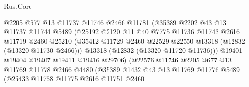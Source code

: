 \begin{lexlean}{RustCore}
\begin{coremodule}
                                @2205
                                @677
                                @13
                                @11737
                                @11746
                                @2466
                                @11781
                                (@35389
                                  @2202
                                  @43
                                  @13
                                  @11737
                                  @11744
                                  @5489
                                  (@25192
                                    @2120
                                    @11
                                    @40
                                    @7775
                                    @11736
                                    @11743
                                    @2616
                                    @11719
                                    @2460
                                    @25210
                                    (@35412
                                      @11729
                                      @2460
                                      @22529
                                      @22550
                                      @13318
                                      (@12832 (@13320 @11730 @2466)))
                                    @13318
                                    (@12832 (@13320 @11720 @11736)))
                                  @19401
                                  @19404
                                  @19407
                                  @19411
                                  @19416
                                  @29706)
                                (@22576
                                  @11746
                                  @2205
                                  @677
                                  @13
                                  @11769
                                  @11778
                                  @2466
                                  @4480
                                  (@35389
                                    @1432
                                    @43
                                    @13
                                    @11769
                                    @11776
                                    @5489
                                    (@25433
                                      @11768
                                      @11775
                                      @2616
                                      @11751
                                      @2460

\end{coremodule}
\end{lexlean}
